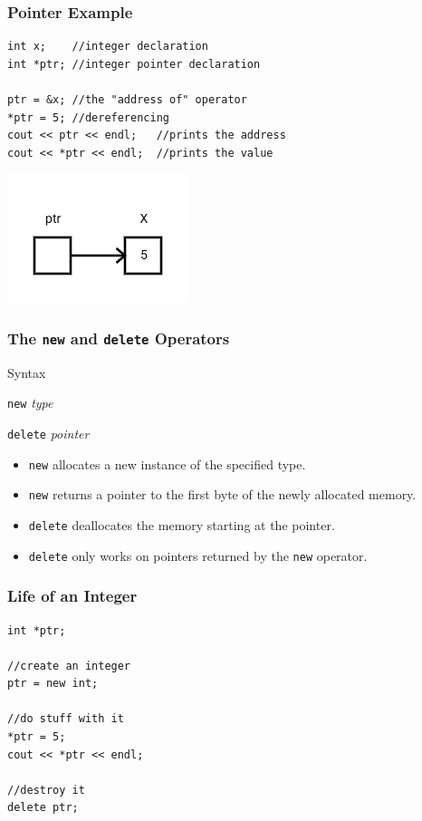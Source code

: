 \documentclass{beamer}
\begin{document}
\begin{frame}[fragile]
    \frametitle{Pointer Example}
    \begin{verbatim}
int x;    //integer declaration
int *ptr; //integer pointer declaration

ptr = &x; //the "address of" operator
*ptr = 5; //dereferencing 
cout << ptr << endl;   //prints the address
cout << *ptr << endl;  //prints the value
    \end{verbatim}
    \begin{center}
       \includegraphics[height=0.25\textheight]{images/varptr}
    \end{center}
\end{frame}


\begin{frame}
    \frametitle{The {\tt new} and {\tt delete} Operators}
    \begin{block}{Syntax}
        \par{\tt new} {\em type}
        \par{\tt delete} {\em pointer}
    \end{block}
    \begin{itemize}
        \item {\tt new} allocates a new instance of the specified type.
        \item {\tt new} returns a pointer to the first byte of the newly 
            allocated memory.
        \item {\tt delete} deallocates the memory starting at the pointer.
        \item {\tt delete} only works on pointers returned by the {\tt new}
            operator.
    \end{itemize}
\end{frame}

\begin{frame}[fragile]
    \frametitle{Life of an Integer}
    \begin{verbatim}
int *ptr;

//create an integer
ptr = new int;

//do stuff with it
*ptr = 5;
cout << *ptr << endl;

//destroy it
delete ptr;
    \end{verbatim}
\end{frame}
\end{document}
